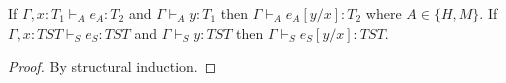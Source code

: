 \begin{lemma}
\label{tms}
If $\Gamma,x:T_{1}\vdash_{A}e_{A}:T_{2}$ and $\Gamma\vdash_{A}y:T_{1}$ then $\Gamma\vdash_{A}e_{A}[y/x]:T_{2}$ where $A\in\lbrace H,M\rbrace$.  If $\Gamma,x:TST\vdash_{S}e_{S}:TST$ and $\Gamma\vdash_{S}y:TST$ then $\Gamma\vdash_{S}e_{S}[y/x]:TST$.
\begin{proof}
By structural induction.
\end{proof}
\end{lemma}
